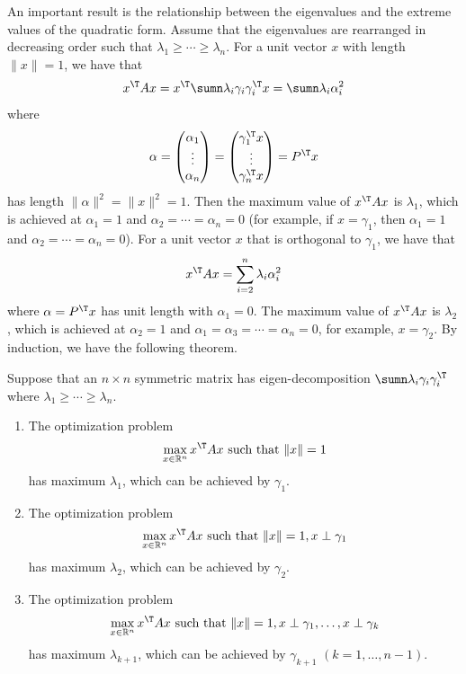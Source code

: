 An important result is the relationship between the eigenvalues and the extreme values of the quadratic form. Assume that the eigenvalues are rearranged in decreasing order such that $\lambda_1 \geq \cdots \geq \lambda_n$. 
For a unit vector $x$ with length $\| x \| = 1$, we have that
$$
x^{\T} A x = x^{\T} \sumn\lambda_{i}\gamma_{i}\gamma_{i}^{\T} x 
= \sumn\lambda_{i}  \alpha_{i}^2  
$$
where 
$$
\alpha 
= \begin{pmatrix}
\alpha_1 \\
\vdots \\
\alpha_n
\end{pmatrix}
= \begin{pmatrix}
\gamma_1^{\T} x \\
\vdots \\
\gamma_{n}^{\T} x
\end{pmatrix}
= P^{\T} x
$$
has length $ \|\alpha \|^2  = \| x\|^2 = 1$.
Then the maximum value of $x^{\T} A x $ is $\lambda_1$, which is achieved at $\alpha_1 = 1$ and $\alpha_2 = \cdots = \alpha_n = 0$ (for example, if $x = \gamma_1$, then $\alpha_1 = 1$ and $\alpha_2 = \cdots = \alpha_n = 0$). For a unit vector $x$ that is orthogonal to $\gamma_1$, we have that
$$
x^{\T} A x  = \sum_{i=2}^n \lambda_{i}  \alpha_{i}^2 
$$
where $\alpha = P^{\T} x$ has unit length with $\alpha_1 = 0$. The maximum value of $x^{\T} A x $ is $\lambda_2$, which is achieved at $\alpha_2 = 1$ and $\alpha_1 = \alpha_3 = \cdots = \alpha_n = 0$, for example, $x = \gamma_2$. By induction, we have the following theorem.

\begin{theorem}
\label{thm::eigven-max-q}
Suppose that an $n\times n$ symmetric matrix has eigen-decomposition $\sumn\lambda_{i}\gamma_{i}\gamma_{i}^{\T}$ where $\lambda_1 \geq \cdots \geq \lambda_n$. 
\begin{enumerate}
\item
The optimization problem
$$
\max_{x \in \mathbb{R}^n} x^{\T} A x \text{ such that } \|x\| = 1
$$
has maximum $\lambda_1$, which can be achieved by $\gamma_1$.
\item
The optimization problem
$$
\max_{x \in \mathbb{R}^n} x^{\T} A x \text{ such that } \|x\| = 1,  x \perp \gamma_1 
$$
has maximum $\lambda_2$, which can be achieved  by $\gamma_2$.
\item
The optimization problem
$$
\max_{x \in \mathbb{R}^n} x^{\T} A x \text{ such that } \|x\| = 1,  x \perp \gamma_1 ,\ldots, x\perp \gamma_k
$$
has maximum $\lambda_{k+1}$, which can be achieved by $\gamma_{k+1}$ $(k=1, \ldots, n-1)$. 
\end{enumerate}
\end{theorem}

